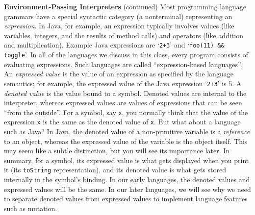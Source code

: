 \begin{minipage}[t]{\sw}
\slidenumber
\LARGE
{\bf Environment-Passing Interpreters} (continued)\exx
\Large
Most programming language grammars
have a special syntactic category (a nonterminal)
representing an {\em expression}.
In Java, for example, an expression typically involves values
(like variables, integers, and the results of method calls) and operators
(like addition and multiplication).
Example Java expressions are `\verb'2+3'' and `\verb'foo(11) && toggle''.
In all of the languages we discuss in this class,
every program consists of evaluating expressions.
Such languages are called ``expression-based languages''.\exx
An {\em expressed value} is the value of an expression
as specified by the language semantics;
for example,
the expressed value of the Java expression `\verb'2+3'' is 5.
A {\em denoted value} is the value bound to a symbol.
Denoted values are internal to the interpreter,
whereas expressed values are values
of expressions that can be seen ``from the outside''.\exx
For a symbol, say \verb'x', you normally think
that the value of the expression \verb'x' is the same
as the denoted value of \verb'x'.
But what about a language such as Java?
In Java, the denoted value of a non-primitive variable
is a {\em reference} to an object,
whereas the expressed value of the variable
is the object itself.
This may seem like a subtle distinction,
but you will see its importance later.\exx
In summary, for a symbol,
its expressed value is what gets displayed
when you print it (its \verb'toString' representation),
and its denoted value is what gets stored internally
in the symbol's binding.
In our early languages, the denoted values and expressed values
will be the same.
In our later languages, we will see why we need to separate denoted values
from expressed values to implement language features such as mutation.
\end{minipage}
